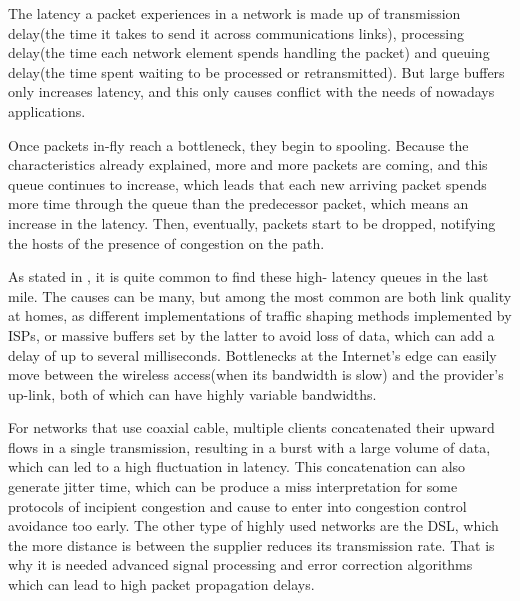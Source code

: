 The latency a packet experiences in a network is made up of transmission
delay(the time it takes to send it across communications links), processing
delay(the time each network element spends handling the packet) and queuing
delay(the time spent waiting to be processed or retransmitted). But large
buffers only increases latency, and this only causes conflict with the needs
of nowadays applications.

Once packets in-fly reach a bottleneck, they begin to spooling. Because the
characteristics already explained, more and more packets are coming, and this
queue continues to increase, which leads that each new arriving packet spends
more time through the queue than the predecessor packet, which means an
increase in the latency. Then, eventually, packets start to be dropped,
notifying the hosts of the presence of congestion on the path.

As stated in \cite{Dischinger2007CRB}, it is quite common to find these high-
latency queues in the last mile. The causes can be many, but among the most
common are both link quality at homes, as different implementations of traffic
shaping methods implemented by ISPs, or massive buffers set by the latter to
avoid loss of data, which can add a delay of up to several milliseconds.
Bottlenecks at the Internet's edge can easily move between the wireless
access(when its bandwidth is slow) and the provider's up-link, both of which
can have highly variable bandwidths.

For networks that use coaxial cable, multiple clients concatenated their
upward flows in a single transmission, resulting in a burst with a large
volume of data, which can led to a high fluctuation in latency. This
concatenation can also generate jitter time, which can be produce a miss
interpretation for some protocols of incipient congestion and cause to enter
into congestion control avoidance too early. The other type of highly used
networks are the DSL, which the more distance is between the supplier reduces
its transmission rate. That is why it is needed advanced signal processing and
error correction algorithms which can lead to high packet propagation delays.
